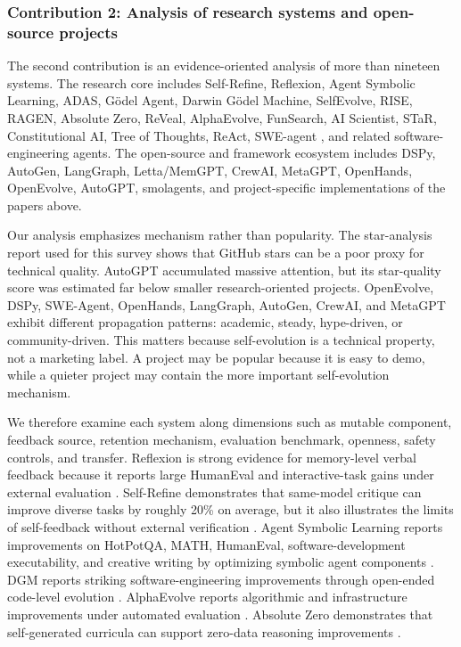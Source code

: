 \subsubsection{Contribution 2: Analysis of research systems and open-source projects}

The second contribution is an evidence-oriented analysis of more than nineteen systems. The research core includes Self-Refine, Reflexion, Agent Symbolic Learning, ADAS, G{\"o}del Agent, Darwin G{\"o}del Machine, SelfEvolve, RISE, RAGEN, Absolute Zero, ReVeal, AlphaEvolve, FunSearch, AI Scientist, STaR, Constitutional AI, Tree of Thoughts, ReAct, SWE-agent \cite{sweagent2024}, and related software-engineering agents. The open-source and framework ecosystem includes DSPy, AutoGen, LangGraph, Letta/MemGPT, CrewAI, MetaGPT, OpenHands, OpenEvolve, AutoGPT, smolagents, and project-specific implementations of the papers above.

Our analysis emphasizes mechanism rather than popularity. The star-analysis report used for this survey shows that GitHub stars can be a poor proxy for technical quality. AutoGPT accumulated massive attention, but its star-quality score was estimated far below smaller research-oriented projects. OpenEvolve, DSPy, SWE-Agent, OpenHands, LangGraph, AutoGen, CrewAI, and MetaGPT exhibit different propagation patterns: academic, steady, hype-driven, or community-driven. This matters because self-evolution is a technical property, not a marketing label. A project may be popular because it is easy to demo, while a quieter project may contain the more important self-evolution mechanism.

We therefore examine each system along dimensions such as mutable component, feedback source, retention mechanism, evaluation benchmark, openness, safety controls, and transfer. Reflexion is strong evidence for memory-level verbal feedback because it reports large HumanEval and interactive-task gains under external evaluation \cite{reflexion2023}. Self-Refine demonstrates that same-model critique can improve diverse tasks by roughly 20\% on average, but it also illustrates the limits of self-feedback without external verification \cite{selfrefine2023}. Agent Symbolic Learning reports improvements on HotPotQA, MATH, HumanEval, software-development executability, and creative writing by optimizing symbolic agent components \cite{agentsymboliclearning2024}. DGM reports striking software-engineering improvements through open-ended code-level evolution \cite{darwingodelmachine2025}. AlphaEvolve reports algorithmic and infrastructure improvements under automated evaluation \cite{alphaevolve2025}. Absolute Zero demonstrates that self-generated curricula can support zero-data reasoning improvements \cite{absolutezero2025}.

